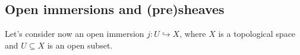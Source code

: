 \documentclass[../../main]{subfiles}
\begin{document}
\subsection{Open immersions and (pre)sheaves}
Let's consider now an open immersion \(j\colon U \hookrightarrow X\), where \(X\) is a topological space and \(U \subseteq X\) is an open subset.

\end{document}
